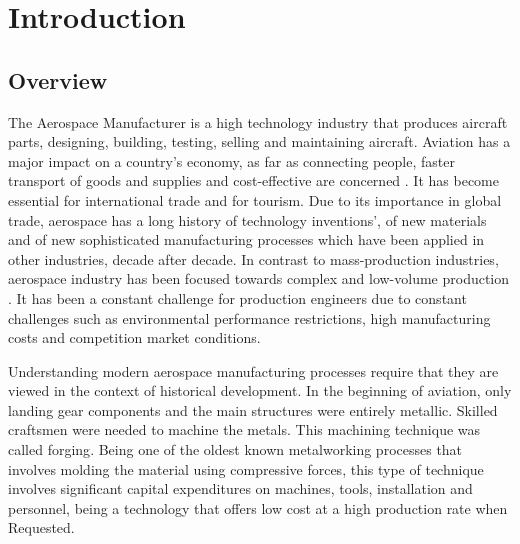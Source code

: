 
\chapter{Introduction}
\label{chapter:introduction}

\section{Overview}
\hspace{10} The Aerospace Manufacturer is a high technology industry that produces aircraft parts, designing, building, testing, selling and maintaining aircraft. Aviation has a major impact on a country’s economy, as far as connecting people, faster transport of goods and supplies and cost-effective are concerned \cite{camelia2010economic}. It has become essential for international trade and for tourism. Due to its importance in global trade, aerospace has a long history of technology inventions’, of new materials and of new sophisticated manufacturing processes which have been applied in other industries, decade after decade. In contrast to mass-production industries, aerospace industry has been focused towards complex and low-volume production \cite{synnes2016bridging}. It has been a constant challenge for production engineers due to constant challenges such as environmental performance restrictions, high manufacturing costs and competition market conditions.\par

Understanding modern aerospace manufacturing processes require that they are viewed in the context of historical development. In the beginning of aviation, only landing gear components and the main structures were entirely metallic. Skilled craftsmen were needed to machine the metals. This machining technique was called forging\cite{ASIM}. Being one of the oldest known metalworking processes that involves molding the material using compressive forces, this type of technique involves significant capital expenditures on machines, tools, installation and personnel, being a technology that offers low cost at a high production rate when Requested. \par

